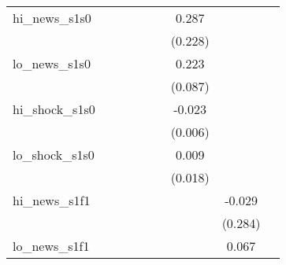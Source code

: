 {\begin{tabular}{l*{8}{c}}
\addlinespace
hi\_news\_s1s0&                     &                     &                     &                     &                     &       0.287         &                     &                     \\
            &                     &                     &                     &                     &                     &     (0.228)         &                     &                     \\
\addlinespace
lo\_news\_s1s0&                     &                     &                     &                     &                     &       0.223\sym{**} &                     &                     \\
            &                     &                     &                     &                     &                     &     (0.087)         &                     &                     \\
\addlinespace
hi\_shock\_s1s0&                     &                     &                     &                     &                     &      -0.023\sym{***}&                     &                     \\
            &                     &                     &                     &                     &                     &     (0.006)         &                     &                     \\
\addlinespace
lo\_shock\_s1s0&                     &                     &                     &                     &                     &       0.009         &                     &                     \\
            &                     &                     &                     &                     &                     &     (0.018)         &                     &                     \\
\addlinespace
hi\_news\_s1f1&                     &                     &                     &                     &                     &                     &      -0.029         &                     \\
            &                     &                     &                     &                     &                     &                     &     (0.284)         &                     \\
\addlinespace
lo\_news\_s1f1&                     &                     &                     &                     &                     &                     &       0.067         &                     \\

\end{tabular}}
